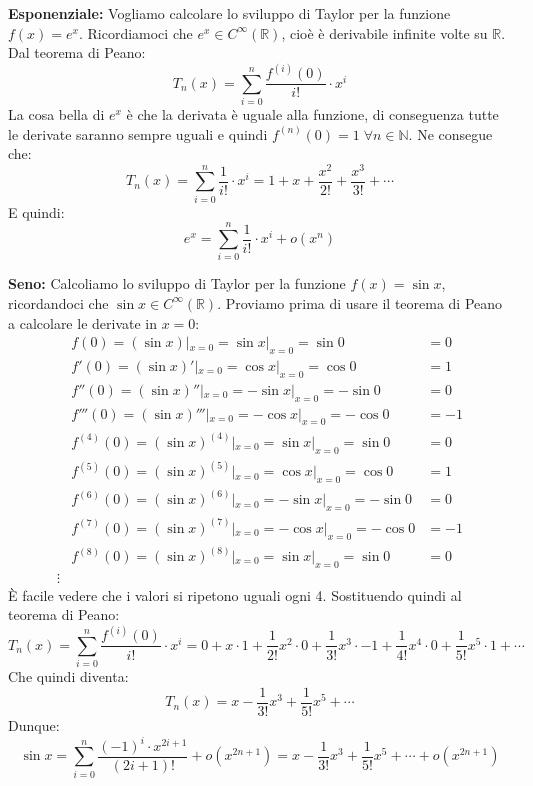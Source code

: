 \textbf{Esponenziale:} Vogliamo calcolare lo sviluppo di Taylor per la funzione $f(x) = e^x$. Ricordiamoci che $e^x \in C^\infty (\mathbb{R})$, cioè è derivabile infinite volte su $\mathbb{R}$. Dal teorema di Peano:
\begin{equation*}
	T_n(x) = \sum \limits_{i = 0}^n \dfrac{f^{(i)}(0)}{i!} \cdot x^i 
\end{equation*}
La cosa bella di $e^x$ è che la derivata è uguale alla funzione, di conseguenza tutte le derivate saranno sempre uguali e quindi $f^{(n)}(0) = 1 \; \forall n \in \mathbb{N}$. Ne consegue che:
\begin{equation*}
	T_n(x) = \sum \limits_{i = 0}^n \dfrac{1}{i!} \cdot x^i = 1 + x + \dfrac{x^2}{2!} + \dfrac{x^3}{3!} + \cdots
\end{equation*}
E quindi:
\begin{equation*}
	e^x = \sum \limits_{i = 0}^n \dfrac{1}{i!} \cdot x^i + o(x^n)
\end{equation*}


\textbf{Seno:} Calcoliamo lo sviluppo di Taylor per la funzione $f(x) = \sin{x}$, ricordandoci che $\sin{x} \in C^\infty (\mathbb{R})$. Proviamo prima di usare il teorema di Peano a calcolare le derivate in $x = 0$:
\begin{align*}
	&f(0) = (\sin{x}) |_{x = 0} = \sin{x} |_{x = 0} = \sin{0} &= 0\\[5pt]
	&f'(0) = (\sin{x})' |_{x = 0} = \cos{x} |_{x = 0} = \cos{0} &= 1\\[5pt]
	&f''(0) = (\sin{x})'' |_{x = 0} = -\sin{x} |_{x = 0} = -\sin{0} &= 0\\[5pt]
	&f'''(0) = (\sin{x})''' |_{x = 0} = -\cos{x} |_{x = 0} = -\cos{0} &= -1\\[5pt]
	&f^{(4)}(0) = (\sin{x})^{(4)} |_{x = 0} = \sin{x} |_{x = 0} = \sin{0} &= 0\\[5pt]
	&f^{(5)}(0) = (\sin{x})^{(5)} |_{x = 0} = \cos{x} |_{x = 0} = \cos{0} &= 1\\[5pt]
	&f^{(6)}(0) = (\sin{x})^{(6)}|_{x = 0} = -\sin{x} |_{x = 0} = -\sin{0} &= 0\\[5pt]
	&f^{(7)}(0) = (\sin{x})^{(7)} |_{x = 0} = -\cos{x} |_{x = 0} = -\cos{0} &= -1\\[5pt]
	&f^{(8)}(0) = (\sin{x})^{(8)} |_{x = 0} = \sin{x} |_{x = 0} = \sin{0} &= 0\\
	\vdots
\end{align*}
È facile vedere che i valori si ripetono uguali ogni 4. Sostituendo quindi al teorema di Peano:
\begin{equation*}
	T_n(x) = \sum \limits_{i = 0}^n \dfrac{f^{(i)}(0)}{i!} \cdot x^i = 0 + x \cdot 1 + \dfrac{1}{2!}x^2 \cdot 0 + \dfrac{1}{3!}x^3 \cdot -1 + \dfrac{1}{4!}x^4 \cdot 0 + \dfrac{1}{5!}x^5 \cdot 1 + \cdots 
\end{equation*}
Che quindi diventa:
\begin{equation*}
	T_n(x) = x - \dfrac{1}{3!}x^3 + \dfrac{1}{5!}x^5 + \cdots
\end{equation*}
Dunque:
\begin{equation*}
	\sin{x} = \sum \limits_{i = 0}^n \dfrac{(-1)^i \cdot x^{2i + 1}}{(2i+1)!} + o(x^{2n +1})= x - \dfrac{1}{3!}x^3 + \dfrac{1}{5!}x^5 + \cdots + o(x^{2n + 1})
\end{equation*}

